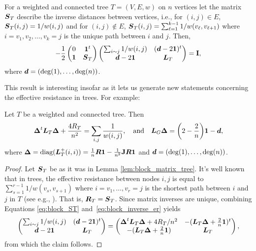 \begin{lemma}
	\label{lem:block_matrix_tree}
 For a weighted and connected tree $T=(V,E,w)$ on $n$ vertices let the matrix $\vb*{S}_T$ describe the inverse distances  between vertices, i.e., for $(i,j)\in E$, $\vb*{S}_T(i,j) = 1/w(i,j)$ and for $(i,j)\notin E$, $\vb*{S}_T(i,j) = \sum_{\ell=1}^{k-1} 1/w(v_\ell,v_{\ell+1})$ where $i=v_1,v_2,\dots,v_k=j$ is the unique path between $i$ and $j$. Then,
 \begin{equation}
 \label{eq:block_ST}
-\frac{1}{2} \begin{pmatrix}
0 & \vb{1}^t \\
\vb{1} & \vb*{S}_T 
\end{pmatrix}
\begin{pmatrix}
\sum_{i\sim j}1/w(i,j)  & (\vb*{d}-2\vb{1})^t \\
\vb*{d}-2\vb{1} & \vb*{L}_T
\end{pmatrix} = \vb{I},
 \end{equation}
 where  $\vb*{d}=(\deg(1),\dots,\deg(n))$. 
\end{lemma}

This result is interesting insofar  as it lets us generate new statements concerning the effective resistance in trees. For example:  

\begin{corollary}
	Let $T$  be a weighted and connected tree. Then 
	\begin{equation*}
	\vb*{\Delta}^t \vb*{L}_T\vb*{\Delta} + \frac{4R_T}{n^2} = \sum_{i,j}  \frac{1}{w(i,j)}, \quad \text{and}\quad \vb*{L}_G\vb*{\Delta} = \bigg(2-\frac{2}{n}\bigg)\vb{1} - \vb*{d},
	\end{equation*}
	where $\vb*{\Delta} = \text{diag}(\vb*{L}_T^+(i,i))=\frac{1}{n}\vb*{R}\vb{1} - \frac{1}{n^2} \vb{J} \vb*{R}\vb{1}$ and $\vb*{d}= (\deg(1),\dots,\deg(n))$. 
\end{corollary}
\begin{proof}
	Let $\vb*{S}_T$ be as it was in  Lemma \ref{lem:block_matrix_tree}. It's well known  that in trees, the effective resistance between nodes $i,j$  is equal to $\sum_{s=1}^{r-1} 1/w(v_s,v_{s+1})$ where $i=v_1,\dots,v_r=j$ is the shortest path between $i$ and $j$ in $T$ (see e.g., \cite{ellens2011effective}). That is, $\vb*{R}_T=\vb*{S}_T$. Since matrix inverses are unique, combining Equations \eqref{eq:block_ST} and~\eqref{eq:block_inverse_er} yields 
	\begin{equation*}
	\begin{pmatrix}
	\sum_{i\sim j}1/w(i,j)  & (\vb*{d}-2\vb{1})^t \\
	\vb*{d}-2\vb{1} & \vb*{L}_T
	\end{pmatrix} = \begin{pmatrix}
	\vb*{\Delta}^t  \vb*{L}_T \vb*{\Delta}  + 4R_T/n^2
	&  -(\vb*{L}_T\vb*{\Delta} + \frac{2}{n}\vb{1} )^t \\
	-(\vb*{L}_T\vb*{\Delta} + \frac{2}{n}\vb{1} ) 
	& \vb*{L}_T
	\end{pmatrix},
	\end{equation*}  
	from which the claim follows. 
\end{proof}






